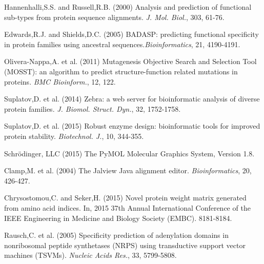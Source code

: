 \documentclass{bioinfo}
\begin{document}
\begin{thebibliography}{}
% 
Hannenhalli,S.S. and Russell,R.B. (2000) Analysis and prediction of functional sub-types from protein sequence alignments. {\it J. Mol. Biol.}, 303, 61-76.

Edwards,R.J. and Shields,D.C. (2005) BADASP: predicting functional specificity in protein families using ancestral sequences.{\it Bioinformatics}, 21, 4190-4191.

Olivera-Nappa,A. et al. (2011) Mutagenesis Objective Search and Selection Tool (MOSST): an algorithm to predict structure-function related mutations in proteins. {\it BMC Bioinform.},  12, 122.

Suplatov,D. et al. (2014) Zebra: a web server for bioinformatic analysis of diverse protein families. {\it J. Biomol. Struct. Dyn.}, 32, 1752-1758.

Suplatov,D. et al. (2015) Robust enzyme design: bioinformatic tools for improved protein stability. {\it Biotechnol. J.}, 10, 344-355.

Schrödinger, LLC (2015) The PyMOL Molecular Graphics System, Version 1.8.

Clamp,M. et al. (2004) The Jalview Java alignment editor. {\it Bioinformatics}, 20, 426-427.

Chrysostomou,C. and Seker,H. (2015) Novel protein weight matrix generated from amino acid indices. In, 2015 37th Annual International Conference of the IEEE Engineering in Medicine and Biology Society (EMBC). 8181-8184.

Rausch,C. et al. (2005) Specificity prediction of adenylation domains in nonribosomal peptide synthetases (NRPS) using transductive support vector machines (TSVMs). {\it Nucleic Acids Res.}, 33, 5799-5808.


\end{thebibliography}
\end{document}
